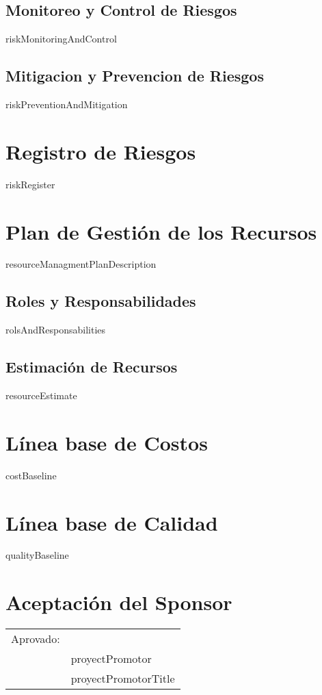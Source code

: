 \documentclass{article}
\begin{document}
\subsection{Monitoreo y Control de Riesgos}
{{riskMonitoringAndControl}}
\subsection{Mitigacion y Prevencion de Riesgos}
{{riskPreventionAndMitigation}}
\section{Registro de Riesgos}
{{riskRegister}}
\section{Plan de Gestión de los Recursos}
{{resourceManagmentPlanDescription}}
\subsection{Roles y Responsabilidades}
{{rolsAndResponsabilities}}
\subsection{Estimación de Recursos}
{{resourceEstimate}}
\section{Línea base de Costos}
{{costBaseline}}
\section{Línea base de Calidad}
{{qualityBaseline}}
\section{Aceptación del Sponsor}

\vspace{2.5cm}

\begin{tabular}{@{}p{.5in}p{4in}@{}}
Aprovado: & \hrulefill \\
\rowcolor{white} & {{proyectPromotor}} \\
\rowcolor{white} & {{proyectPromotorTitle}}\\
\end{tabular}
\end{document}
